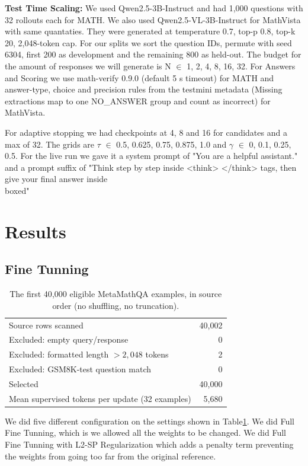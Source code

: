 \documentclass{article}
\begin{document}
\textbf{Test Time Scaling:} We used Qwen2.5-3B-Instruct and had 1,000 questions with 32 rollouts each for MATH. We also used Qwen2.5-VL-3B-Instruct for MathVista with same quantaties. They were
generated at temperature 0.7, top-p 0.8, top-k 20, 2,048-token cap. For our splits we sort the question IDs, permute with seed 6304, first 200 as development and the remaining 800 as held-out.
The budget for the amount of responses we will generate is N $\in$ {1, 2, 4, 8, 16, 32}.
For Answers and Scoring we use math-verify 0.9.0 (default 5 s timeout) for MATH and answer-type, choice and precision rules from the testmini metadata (Missing extractions map to one NO\_ANSWER group and count as incorrect)
for MathVista.

For adaptive stopping we had checkpoints at 4, 8 and 16 for candidates and a max of 32. The grids are $\tau$ $\in$ {0.5, 0.625, 0.75, 0.875, 1.0} and $\gamma$ $\in$ {0, 0.1, 0.25, 0.5}.
For the live run we gave it a system prompt of "You are a helpful assistant." and a prompt suffix of "Think step by step inside <think> </think> tags, then give your final answer inside \\boxed{}"

\section{Results}

\subsection{Fine Tunning}

\begin{table}[t]
\centering
\caption{The first 40{,}000 eligible MetaMathQA examples, in source order (no shuffling, no truncation).}
\label{tab:t1-data}
\begin{tabular}{lr}
\toprule
Source rows scanned & 40{,}002 \\
Excluded: empty query/response & 0 \\
Excluded: formatted length $>2{,}048$ tokens & 2 \\
Excluded: GSM8K-test question match & 0 \\
Selected & 40{,}000 \\
Mean supervised tokens per update (32 examples) & 5{,}680 \\
\bottomrule
\end{tabular}
\end{table}

We did five different configuration on the settings shown in Table\ref{tab:t1-data}. We did Full Fine Tunning, which is we allowed all the weights to be changed.
We did Full Fine Tunning with L2-SP Regularization which adds a penalty term preventing the weights from going too far from the original reference.
\end{document}
